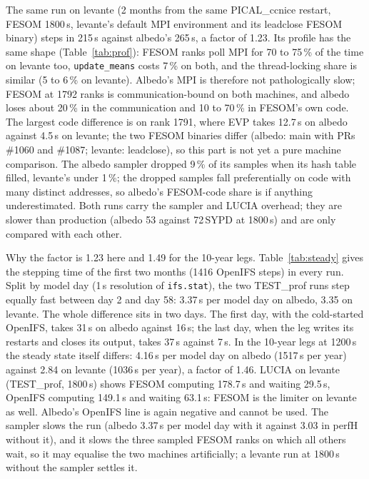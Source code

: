 \documentclass[11pt,a4paper]{article}
\begin{document}
The same run on levante (2 months from the same PICAL\_ccnice restart, FESOM 1800\,s, levante's default MPI environment and its leadclose FESOM binary) steps in 215\,s against albedo's 265\,s, a factor of 1.23. Its profile has the same shape (Table~\ref{tab:prof}): FESOM ranks poll MPI for 70 to 75\,\% of the time on levante too, \texttt{update\_means} costs 7\,\% on both, and the thread-locking share is similar (5 to 6\,\% on levante). Albedo's MPI is therefore not pathologically slow; FESOM at 1792 ranks is communication-bound on both machines, and albedo loses about 20\,\% in the communication and 10 to 70\,\% in FESOM's own code. The largest code difference is on rank 1791, where EVP takes 12.7\,s on albedo against 4.5\,s on levante; the two FESOM binaries differ (albedo: main with PRs \#1060 and \#1087; levante: leadclose), so this part is not yet a pure machine comparison. The albedo sampler dropped 9\,\% of its samples when its hash table filled, levante's under 1\,\%; the dropped samples fall preferentially on code with many distinct addresses, so albedo's FESOM-code share is if anything underestimated. Both runs carry the sampler and LUCIA overhead; they are slower than production (albedo 53 against 72\,SYPD at 1800\,s) and are only compared with each other.

Why the factor is 1.23 here and 1.49 for the 10-year legs. Table~\ref{tab:steady} gives the stepping time of the first two months (1416 OpenIFS steps) in every run. Split by model day (1\,s resolution of \texttt{ifs.stat}), the two TEST\_prof runs step equally fast between day 2 and day 58: 3.37\,s per model day on albedo, 3.35 on levante. The whole difference sits in two days. The first day, with the cold-started OpenIFS, takes 31\,s on albedo against 16\,s; the last day, when the leg writes its restarts and closes its output, takes 37\,s against 7\,s. In the 10-year legs at 1200\,s the steady state itself differs: 4.16\,s per model day on albedo (1517\,s per year) against 2.84 on levante (1036\,s per year), a factor of 1.46. LUCIA on levante (TEST\_prof, 1800\,s) shows FESOM computing 178.7\,s and waiting 29.5\,s, OpenIFS computing 149.1\,s and waiting 63.1\,s: FESOM is the limiter on levante as well. Albedo's OpenIFS line is again negative and cannot be used. The sampler slows the run (albedo 3.37\,s per model day with it against 3.03 in perfH without it), and it slows the three sampled FESOM ranks on which all others wait, so it may equalise the two machines artificially; a levante run at 1800\,s without the sampler settles it.
\end{document}
